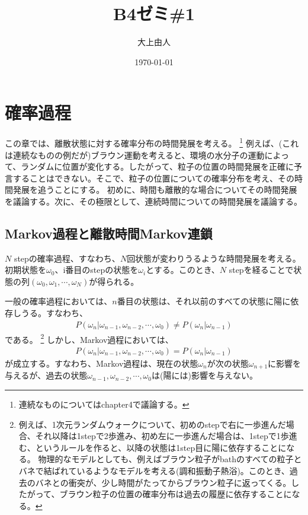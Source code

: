 \documentclass[a4paper,11pt]{jsarticle}
\numberwithin{equation}{section}
\begin{document}
\title{B4ゼミ\#1}
\author{大上由人}
\date{\today}
\maketitle

\setcounter{section}{1}
\section{確率過程}
この章では、離散状態に対する確率分布の時間発展を考える。
\footnote{連続なものについてはchapter4で議論する。}
例えば、(これは連続なものの例だが)ブラウン運動を考えると、環境の水分子の運動によって、ランダムに位置が変化する。したがって、粒子の位置の時間発展を正確に予言することはできない。そこで、粒子の位置についての確率分布を考え、その時間発展を追うことにする。
初めに、時間も離散的な場合についてその時間発展を議論する。次に、その極限として、連続時間についての時間発展を議論する。

\subsection{Markov過程と離散時間Markov連鎖}
$N$ stepの確率過程、すなわち、$N$回状態が変わりうるような時間発展を考える。初期状態を$\omega_0$、i番目のstepの状態を$\omega_i$とする。このとき、$N$ stepを経ることで状態の列$(\omega_0, \omega_1, \cdots, \omega_N)$が得られる。

一般の確率過程においては、$n$番目の状態は、それ以前のすべての状態に陽に依存しうる。すなわち、
\begin{align}
    P(\omega_n | \omega_{n-1}, \omega_{n-2}, \cdots, \omega_0) \neq P(\omega_n | \omega_{n-1}) 
\end{align}
である。
\footnote{
    例えば、1次元ランダムウォークについて、初めのstepで右に一歩進んだ場合、それ以降は1stepで2歩進み、初め左に一歩進んだ場合は、1stepで1歩進む、というルールを作ると、以降の状態は1step目に陽に依存することになる。
    物理的なモデルとしても、例えばブラウン粒子がbathのすべての粒子とバネで結ばれているようなモデルを考える(調和振動子熱浴)。このとき、過去のバネとの衝突が、少し時間がたってからブラウン粒子に返ってくる。したがって、ブラウン粒子の位置の確率分布は過去の履歴に依存することになる。
}
しかし、Markov過程においては、
\begin{align}
    P(\omega_n | \omega_{n-1}, \omega_{n-2}, \cdots, \omega_0) = P(\omega_n | \omega_{n-1})
\end{align}
が成立する。すなわち、Markov過程は、現在の状態$\omega_n$が次の状態$\omega_{n+1}$に影響を与えるが、過去の状態$\omega_{n-1}, \omega_{n-2}, \cdots, \omega_0$は(陽には)影響を与えない。\\
\end{document}

